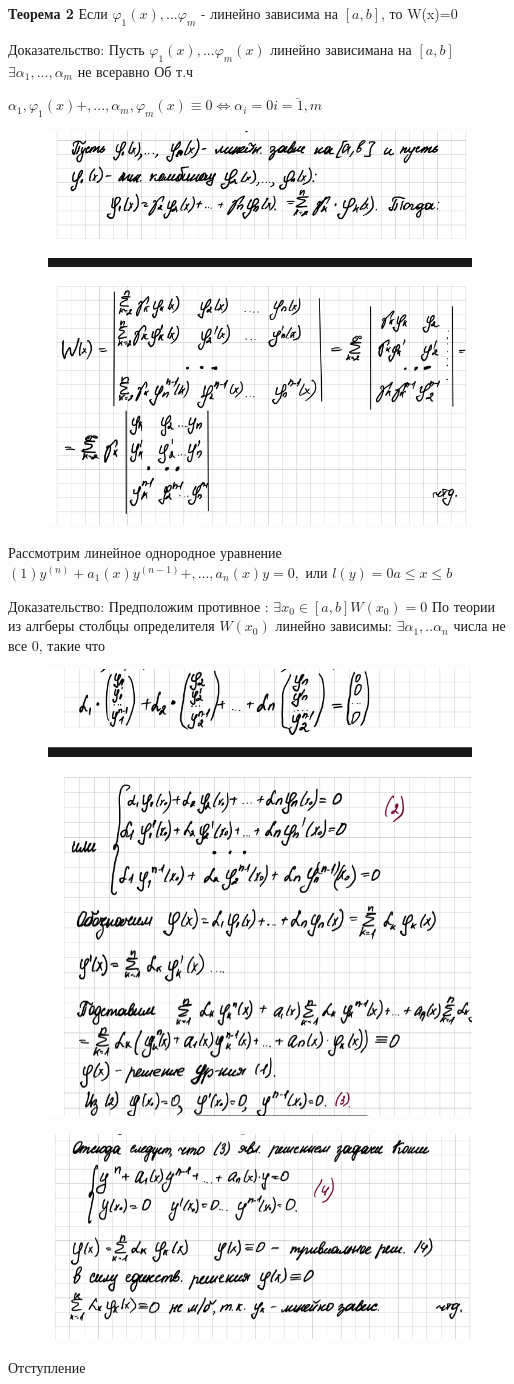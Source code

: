 \documentclass{article}
\begin{document}
\textbf{Теорема 2} Если $\varphi_1(x),... \varphi_m$ - линейно зависима на 
$[a,b]$, то W(x)=0

Доказательство: Пусть $\varphi_1(x),... \varphi_m(x)$ линейно зависимана 
на $[a,b]$ $\exists\alpha_1,...,\alpha_m$ не всеравно Об т.ч

$\alpha_1, \varphi_1(x)+,...,\alpha_m, \varphi_m(x) \equiv 0 \Leftrightarrow \alpha_i=0 \bar{i=1,m}$


\begin{figure}[H]
    \centering
    \includegraphics[width=0.25\linewidth]{Снимок экрана 2025-03-07 102029.png}
\end{figure}



Рассмотрим линейное однородное уравнение
$(1) y^{(n)}+a_1(x)y^{(n-1)}+,...,a_n(x)y=0,$ или $l(y) = 0 a\leq x \leq b $

Доказательство: Предположим противное : $\exists x_0 \in [a,b] W(x_0)=0$
По теории из алгберы столбцы определителя $W(x_0)$ линейно зависимы:
$\exists \alpha_1,..\alpha_n$ числа не все 0, такие что 


\begin{figure}[H]
    \centering
    \includegraphics[width=0.25\linewidth]{Снимок экрана 2025-03-07 103059.png}
\end{figure}

\begin{figure}[H]
    \centering
    \includegraphics[width=0.25\linewidth]{Снимок экрана 2025-03-07 103128.png}
\end{figure}


Отступление 
\end{document}
